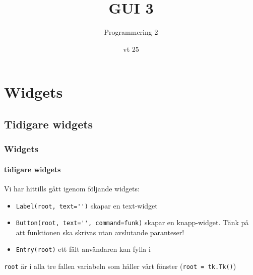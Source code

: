 \documentclass[aspectratio=169]{beamer}
\begin{document}

\newcommand{\fortt}{\texttt{for}}
\newcommand{\whilett}{\texttt{while}}
\newcommand{\iftt}{\texttt{if}}


\title{GUI 3}
\date{vt 25}
\author{Programmering 2}

\maketitle

\tableofcontents

\section{Widgets}

\subsection{Tidigare widgets}

\begin{frame}[fragile]
	\frametitle{Widgets}
	\framesubtitle{tidigare widgets}
	
	Vi har hittills gått igenom följande widgets:
	
	\begin{itemize}
		\item \lstinline!Label(root, text='')! skapar en text-widget
		\item \lstinline!Button(root, text='', command=funk)! skapar en knapp-widget. Tänk på att funktionen ska skrivas utan avslutande paranteser!
		\item \lstinline!Entry(root)! ett fält användaren kan fylla i
	\end{itemize}	
	
	\texttt{root} är i alla tre fallen variabeln som håller vårt fönster (\lstinline!root = tk.Tk()!)
	
\end{frame}
\end{document}
